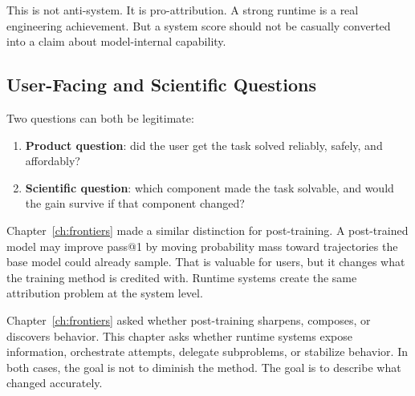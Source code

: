 This is not anti-system. It is pro-attribution. A strong runtime is a real engineering achievement. But a system score should not be casually converted into a claim about model-internal capability.

\subsection{User-Facing and Scientific Questions}

Two questions can both be legitimate:

\begin{enumerate}[nosep]
  \item \textbf{Product question}: did the user get the task solved reliably, safely, and affordably?
  \item \textbf{Scientific question}: which component made the task solvable, and would the gain survive if that component changed?
\end{enumerate}

Chapter~\ref{ch:frontiers} made a similar distinction for post-training. A post-trained model may improve pass@1 by moving probability mass toward trajectories the base model could already sample. That is valuable for users, but it changes what the training method is credited with. Runtime systems create the same attribution problem at the system level.

\begin{tcolorbox}[colback=gray!8, colframe=gray!40, title=\textbf{Echo: From Ch17 to Ch22}]
Chapter~\ref{ch:frontiers} asked whether post-training sharpens, composes, or discovers behavior. This chapter asks whether runtime systems expose information, orchestrate attempts, delegate subproblems, or stabilize behavior. In both cases, the goal is not to diminish the method. The goal is to describe what changed accurately.
\end{tcolorbox}

\noindent{}

